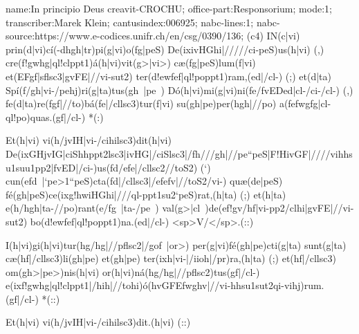 name:In principio Deus creavit-CROCHU;
office-part:Responsorium;
mode:1;
transcriber:Marek Klein;
cantusindex:006925;
nabc-lines:1;
nabc-source:https://www.e-codices.unifr.ch/en/csg/0390/136;
(c4)
IN(c|vi) prin(d|vi)cí(-dhgh|tr)pi(g|vi)o(fg|peS) De(ixivHGhi|/////ci-peS)us(h|vi) (,)
cre(f!gwhg|ql!clppt1)á(h|vi)vit(g>|vi>) cæ(fg|peS)lum(f|vi)
et(EFgf|sflsc3|gvFE|//vi-sut2) ter(d!ewfef|ql!poppt1)ram,(ed|/cl-) (;)
et(d|ta) Spí(f/gh|vi-/pehj)ri(g|ta)tus(gh~|pe~) Dó(h|vi)mi(g|vi)ni(fe/fvEDed|cl-/ci-/cl-) (,)
fe(d|ta)re(fgf|//to)bá(fe|/cllsc3)tur(f|vi) su(gh|pe)per(hgh|//po) a(fefwgfg|cl-ql!po)quas.(gf|/cl-) *(:)

Et(h|vi) vi(h/jvIH|vi-/cihilsc3)dit(h|vi)
De(ixGHjvIG|ciShhppt2lsc3|ivHG|/ciSlsc3|/fh///gh|//pe``peS|F!HivGF|////vihhsu1suu1pp2|fvED|/ci-)us(fd/efe|/cllsc2//toS2) (`)
cun(efd~|`pe>1``peS)cta(fd|/cllsc3|/efefv|//toS2/vi-)
quæ(de|peS) fé(gh|peS)ce(ixg!hwiHGhi|///ql-ppt1su2`peS)rat,(h|ta) (;)
et(h|ta) e(h/hgh|ta-//po)rant(e/fg~|ta-/pe~)
val(g>|cl~)de(ef!gv/hf|vi-pp2/clhi|gvFE|//vi-sut2) bo(d!ewfef|ql!poppt1)na.(ed|/cl-) <sp>V/</sp>.(::)

I(h|vi)gi(h|vi)tur(hg/hg|//pflsc2|/gof~|or>) per(g|vi)fé(gh|pe)cti(g|ta) sunt(g|ta)
cæ(hf|/cllsc3)li(gh|pe) et(gh|pe) ter(ixh|vi-|/iioh|/pr)ra,(h|ta) (;)
et(hf|/cllsc3) om(gh>|pe>)nis(h|vi) or(h|vi)ná(hg/hg|//pflsc2)tus(gf|/cl-)
e(ixf!gwhg|ql!clppt1|/hih|//tohi)ó(hvGFEfwghv|//vi-hhsu1sut2qi-vihj)rum.(gf|/cl-) *(::)

Et(h|vi) vi(h/jvIH|vi-/cihilsc3)dit.(h|vi) (::)
